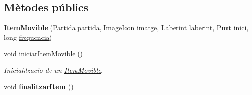 \subsection*{Mètodes públics}
\begin{DoxyCompactItemize}
\item 
\hypertarget{classlogica_1_1_item_movible_a0463ef4d0a9e8e652be4a19b8dfba67c}{{\bfseries Item\+Movible} (\hyperlink{classlogica_1_1_partida}{Partida} \hyperlink{classlogica_1_1_item_movible_ace55b4918a7f671f89ed3109c91359e4}{partida}, Image\+Icon imatge, \hyperlink{classlogica_1_1laberints_1_1_laberint}{Laberint} \hyperlink{classlogica_1_1_item_movible_a97036130b7376d77776427ca126f6fb5}{laberint}, \hyperlink{classlogica_1_1_punt}{Punt} inici, long \hyperlink{classlogica_1_1_item_movible_a1b3a9d9e664cfe044d60cbe083dc7919}{frequencia})}\label{classlogica_1_1_item_movible_a0463ef4d0a9e8e652be4a19b8dfba67c}

\item 
void \hyperlink{classlogica_1_1_item_movible_a9a43835d32363d837ad38635e48483ba}{iniciar\+Item\+Movible} ()
\begin{DoxyCompactList}\small\item\em Inicialitzacio de un \hyperlink{classlogica_1_1_item_movible}{Item\+Movible}. \end{DoxyCompactList}\item 
\hypertarget{classlogica_1_1_item_movible_a3362abf376e2d3fcf4b0690954e8c933}{void {\bfseries finalitzar\+Item} ()}\label{classlogica_1_1_item_movible_a3362abf376e2d3fcf4b0690954e8c933}


\end{DoxyCompactItemize}
